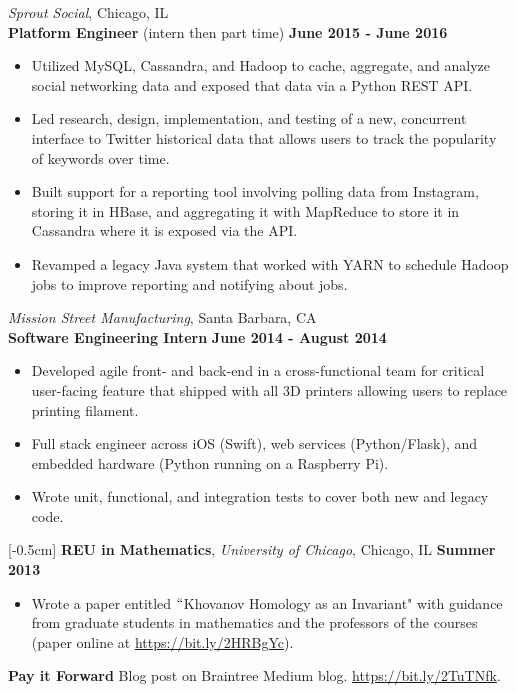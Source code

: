 \documentclass[9pt]{res} %
\begin{document}
\begin{resume}
\textit{\color{MidnightBlue}Sprout Social}, Chicago, IL \\
\textbf{Platform Engineer} (intern then part time) \hspace*{\fill} \textbf{June 2015 - June 2016}
\begin{itemize} 
\item Utilized MySQL, Cassandra, and Hadoop to cache, aggregate, and analyze social networking data and exposed that data via a Python REST API.
\item Led research, design, implementation, and testing of a new, concurrent interface to Twitter historical data that allows users to track the popularity of keywords over time.
\item Built support for a reporting tool involving polling data from Instagram, storing it in HBase, and aggregating it with MapReduce to store it in Cassandra where it is exposed via the API.
\item Revamped a legacy Java system that worked with YARN to schedule Hadoop jobs to improve reporting and notifying about jobs.
\end{itemize}

\textit{\color{MidnightBlue}Mission Street Manufacturing}, Santa Barbara, CA \\
\textbf{Software Engineering Intern} \hspace*{\fill} \textbf{June 2014 - August 2014}
\begin{itemize}
\item Developed agile front- and back-end in a cross-functional team for critical user-facing feature that shipped with all 3D printers allowing users to replace printing filament.
\item Full stack engineer across iOS (Swift), web services (Python/Flask), and embedded hardware (Python running on a Raspberry Pi).
\item Wrote unit, functional, and integration tests to cover both new and legacy code.
\end{itemize}

\vspace{-5pt}
[-0.5cm] 
\textbf{REU in Mathematics}, \textit{University of Chicago}, Chicago, IL \hspace{\fill} \textbf{Summer 2013}
\begin{itemize} \itemsep -5pt
\item Wrote a paper entitled $``$Khovanov Homology as an Invariant" with guidance from graduate students in mathematics and the professors of the courses (paper online at \url{https://bit.ly/2HRBgYc}).
\end{itemize}
\textbf{Pay it Forward} Blog post on Braintree Medium blog. \url{https://bit.ly/2TuTNfk}.



\end{resume}
\end{document}
